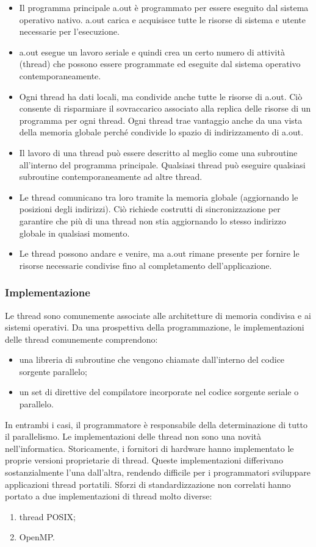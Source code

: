\begin{itemize}
	\item Il programma principale a.out è programmato per essere eseguito dal sistema operativo nativo. a.out carica
	e acquisisce tutte le risorse di sistema e utente necessarie per l'esecuzione.
	\item a.out esegue un lavoro seriale e quindi crea un certo numero di attività
	(thread) che possono essere programmate ed eseguite dal sistema operativo contemporaneamente.
	\item Ogni thread ha dati locali, ma condivide anche tutte le risorse di a.out.
	Ciò consente di risparmiare il sovraccarico associato alla replica delle risorse di un programma
	per ogni thread. Ogni thread trae vantaggio anche da una vista della memoria globale
	perché condivide lo spazio di indirizzamento di a.out.
	\item Il lavoro di una thread può essere descritto al meglio come una subroutine all'interno del programma
	principale. Qualsiasi thread può eseguire qualsiasi subroutine contemporaneamente ad altre thread. 
	\item Le thread comunicano tra loro tramite la memoria globale (aggiornando
	le posizioni degli indirizzi). Ciò richiede costrutti di sincronizzazione per garantire che
	più di una thread non stia aggiornando lo stesso indirizzo globale in qualsiasi
	momento.
	\item Le thread possono andare e venire, ma a.out rimane presente per fornire le risorse necessarie condivise
	fino al completamento dell'applicazione.
\end{itemize}
\subsubsection*{Implementazione}
Le thread sono comunemente associate alle architetture di memoria condivisa e ai sistemi operativi.
Da una prospettiva della programmazione, le implementazioni delle thread comunemente
comprendono:
\begin{itemize}
	\item una libreria di subroutine che vengono chiamate dall'interno del codice sorgente parallelo;
	\item un set di direttive del compilatore incorporate nel codice sorgente seriale o parallelo.
\end{itemize}
In entrambi i casi, il programmatore è responsabile della determinazione di tutto
il parallelismo.
Le implementazioni delle thread non sono una novità nell'informatica.
 Storicamente, i fornitori di hardware hanno implementato le proprie
versioni proprietarie di thread.
 Queste implementazioni differivano sostanzialmente l'una dall'altra, rendendo
difficile per i programmatori sviluppare applicazioni thread portatili.
Sforzi di standardizzazione non correlati hanno portato a due implementazioni di thread molto diverse:
 \begin{enumerate}
 	\item thread POSIX;
 	\item OpenMP.
 \end{enumerate}
 
